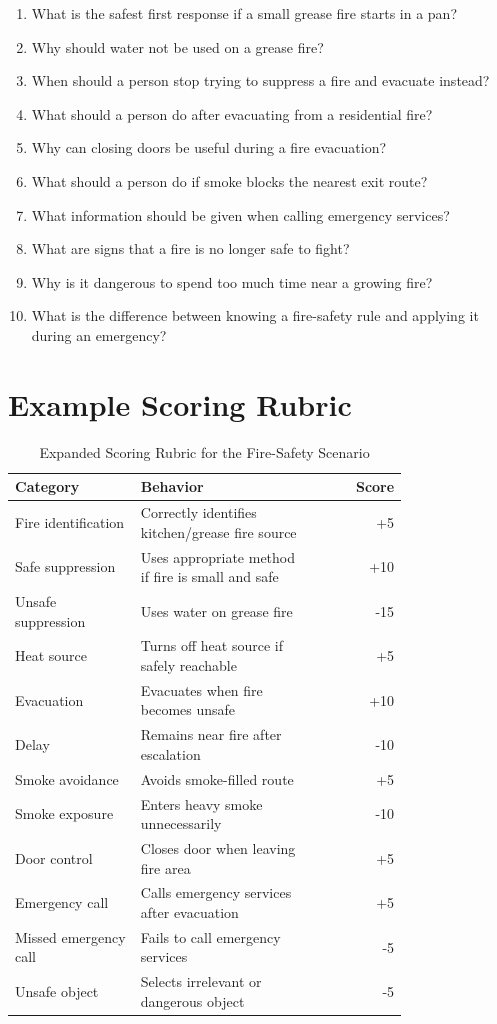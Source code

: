 \documentclass[manuscript, review]{acmart}
\begin{document}
{\begin{enumerate}
  \item What is the safest first response if a small grease fire starts in a pan?
  \item Why should water not be used on a grease fire?
  \item When should a person stop trying to suppress a fire and evacuate instead?
  \item What should a person do after evacuating from a residential fire?
  \item Why can closing doors be useful during a fire evacuation?
  \item What should a person do if smoke blocks the nearest exit route?
  \item What information should be given when calling emergency services?
  \item What are signs that a fire is no longer safe to fight?
  \item Why is it dangerous to spend too much time near a growing fire?
  \item What is the difference between knowing a fire-safety rule and applying it during an emergency?
\end{enumerate}

\section{Example Scoring Rubric}
\label{app:scoring}

\begin{table}[h]
  \caption{Expanded Scoring Rubric for the Fire-Safety Scenario}
  \label{tab:expanded-scoring}
  \begin{tabular}{p{0.32\linewidth}p{0.46\linewidth}r}
    \toprule
    Category & Behavior & Score \\
    \midrule
    Fire identification & Correctly identifies kitchen/grease fire source & +5 \\
    Safe suppression & Uses appropriate method if fire is small and safe & +10 \\
    Unsafe suppression & Uses water on grease fire & -15 \\
    Heat source & Turns off heat source if safely reachable & +5 \\
    Evacuation & Evacuates when fire becomes unsafe & +10 \\
    Delay & Remains near fire after escalation & -10 \\
    Smoke avoidance & Avoids smoke-filled route & +5 \\
    Smoke exposure & Enters heavy smoke unnecessarily & -10 \\
    Door control & Closes door when leaving fire area & +5 \\
    Emergency call & Calls emergency services after evacuation & +5 \\
    Missed emergency call & Fails to call emergency services & -5 \\
    Unsafe object & Selects irrelevant or dangerous object & -5 \\
    \bottomrule
  \end{tabular}
\end{table}

}
\end{document}
